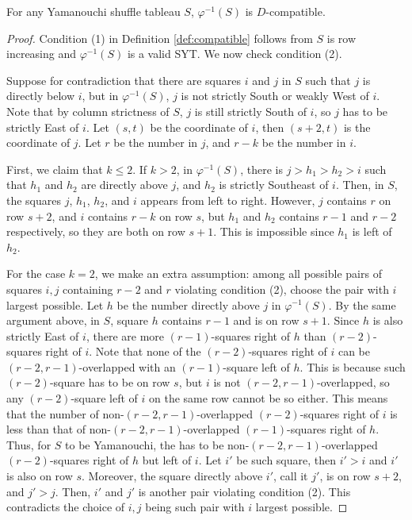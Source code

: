 \documentclass[ALCO,Unicode]{cedram}
\begin{document}
    \begin{lemma}\label{lem:phiS-comp}
        For any Yamanouchi shuffle tableau $S$, $\varphi^{-1}(S)$ is $D$-compatible.
    \end{lemma}

    \begin{proof}
        Condition (1) in Definition \ref{def:compatible} follows from $S$ is row increasing and $\varphi^{-1}(S)$ is a valid SYT. We now check condition (2).

        Suppose for contradiction that there are squares $i$ and $j$ in $S$ such that $j$ is directly below $i$, but in $\varphi^{-1}(S)$, $j$ is not strictly South or weakly West of $i$. Note that by column strictness of $S$, $j$ is still strictly South of $i$, so $j$ has to be strictly East of $i$. Let $(s,t)$ be the coordinate of $i$, then $(s+2,t)$ is the coordinate of $j$. Let $r$ be the number in $j$, and $r-k$ be the number in $i$.

        First, we claim that $k \leq 2$. If $k > 2$, in $\varphi^{-1}(S)$, there is $j > h_1>h_2> i$ such that $h_1$ and $h_2$ are directly above $j$, and $h_2$ is strictly Southeast of $i$. Then, in $S$, the squares $j$, $h_1$, $h_2$, and $i$ appears from left to right. However, $j$ contains $r$ on row $s+2$, and $i$ contains $r-k$ on row $s$, but $h_1$ and $h_2$ contains $r-1$ and $r-2$ respectively, so they are both on row $s+1$. This is impossible since $h_1$ is left of $h_2$.

        For the case $k = 2$, we make an extra assumption: among all possible pairs of squares $i,j$ containing $r-2$ and $r$ violating condition (2), choose the pair with $i$ largest possible. Let $h$ be the number directly above $j$ in $\varphi^{-1}(S)$. By the same argument above, in $S$, square $h$ contains $r-1$ and is on row $s+1$. Since $h$ is also strictly East of $i$, there are more $(r-1)$-squares right of $h$ than $(r-2)$-squares right of $i$. Note that none of the $(r-2)$-squares right of $i$ can be $(r-2,r-1)$-overlapped with an $(r-1)$-square left of $h$. This is because such $(r-2)$-square has to be on row $s$, but $i$ is not $(r-2,r-1)$-overlapped, so any $(r-2)$-square left of $i$ on the same row cannot be so either. This means that the number of non-$(r-2,r-1)$-overlapped $(r-2)$-squares right of $i$ is less than that of non-$(r-2,r-1)$-overlapped $(r-1)$-squares right of $h$. Thus, for $S$ to be Yamanouchi, the has to be non-$(r-2,r-1)$-overlapped $(r-2)$-squares right of $h$ but left of $i$. Let $i'$ be such square, then $i' > i$ and $i'$ is also on row $s$. Moreover, the square directly above $i'$, call it $j'$, is on row $s+2$, and $j' > j$. Then, $i'$ and $j'$ is another pair violating condition (2). This contradicts the choice of $i,j$ being such pair with $i$ largest possible.


\end{proof}
\end{document}

